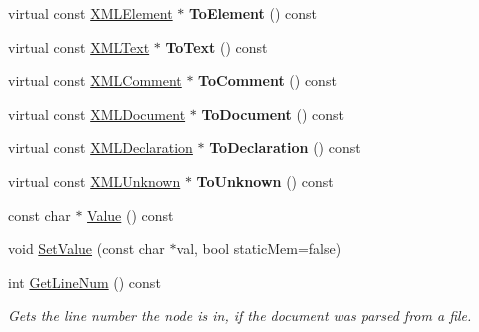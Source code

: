\begin{DoxyCompactItemize}
\mbox{\label{classtinyxml2_1_1_x_m_l_node_a2c5c843b8f37306f15994ebe882b9346}} 
virtual const \mbox{\hyperlink{classtinyxml2_1_1_x_m_l_element}{X\+M\+L\+Element}} $\ast$ {\bfseries To\+Element} () const
\item 
\mbox{\label{classtinyxml2_1_1_x_m_l_node_acb9ccc1beda27c0efcb0545683c3e7f4}} 
virtual const \mbox{\hyperlink{classtinyxml2_1_1_x_m_l_text}{X\+M\+L\+Text}} $\ast$ {\bfseries To\+Text} () const
\item 
\mbox{\label{classtinyxml2_1_1_x_m_l_node_a6a53bb83faf5c0ccc95b6cf74dba0025}} 
virtual const \mbox{\hyperlink{classtinyxml2_1_1_x_m_l_comment}{X\+M\+L\+Comment}} $\ast$ {\bfseries To\+Comment} () const
\item 
\mbox{\label{classtinyxml2_1_1_x_m_l_node_ae8a5250331a5f12e10843fcb5ef3ef0b}} 
virtual const \mbox{\hyperlink{classtinyxml2_1_1_x_m_l_document}{X\+M\+L\+Document}} $\ast$ {\bfseries To\+Document} () const
\item 
\mbox{\label{classtinyxml2_1_1_x_m_l_node_ac48bb4bf9eb7bb3654ad4b94945db9a1}} 
virtual const \mbox{\hyperlink{classtinyxml2_1_1_x_m_l_declaration}{X\+M\+L\+Declaration}} $\ast$ {\bfseries To\+Declaration} () const
\item 
\mbox{\label{classtinyxml2_1_1_x_m_l_node_af29ffd6cbe609b6fa04a705256150408}} 
virtual const \mbox{\hyperlink{classtinyxml2_1_1_x_m_l_unknown}{X\+M\+L\+Unknown}} $\ast$ {\bfseries To\+Unknown} () const
\item 
const char $\ast$ \mbox{\hyperlink{classtinyxml2_1_1_x_m_l_node_a0485e51c670e741884cfd8362274d680}{Value}} () const
\item 
void \mbox{\hyperlink{classtinyxml2_1_1_x_m_l_node_a09dd68cf9eae137579f6e50f36487513}{Set\+Value}} (const char $\ast$val, bool static\+Mem=false)
\item 
\mbox{\label{classtinyxml2_1_1_x_m_l_node_a9b5fc636646fda761d342c72e91cb286}} 
int \mbox{\hyperlink{classtinyxml2_1_1_x_m_l_node_a9b5fc636646fda761d342c72e91cb286}{Get\+Line\+Num}} () const
\begin{DoxyCompactList}\small\item\em Gets the line number the node is in, if the document was parsed from a file. \end{DoxyCompactList}\item 

\end{DoxyCompactItemize}
